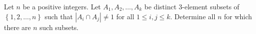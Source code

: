 Let $n$ be a positive integers.
Let $A_1,A_2, \ldots, A_k$ be distinct $3$-element subsets of $\left\{1, 2, \ldots, n\right\}$
such that $|A_i\cap A_j| \neq 1$ for all $1\leq i,j\leq k$.
Determine all $n$ for which there are $n$ such subsets.
